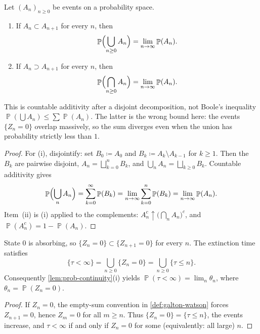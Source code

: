 \documentclass[11pt,a4paper]{article}
\DeclareMathOperator{\Pbb}{\mathbb{P}}
\begin{document}
\begin{lemma}
\label{lem:prob-continuity}
Let \((A_n)_{n\ge 0}\) be events on a probability space.
\begin{enumerate}[label=\textup{(\roman*)}]
    \item
    If \(A_n\subset A_{n+1}\) for every \(n\), then
    \[
    \Pbb\Bigl(\bigcup_{n\ge 0} A_n\Bigr)
    =
    \lim_{n\to\infty}\Pbb(A_n).
    \]
    \item
    If \(A_n\supset A_{n+1}\) for every \(n\), then
    \[
    \Pbb\Bigl(\bigcap_{n\ge 0} A_n\Bigr)
    =
    \lim_{n\to\infty}\Pbb(A_n).
    \]
\end{enumerate}
This is countable additivity after a disjoint decomposition, not Boole's inequality \(\Pbb(\bigcup A_n)\le\sum\Pbb(A_n)\). The latter is the wrong bound here: the events \(\{Z_n=0\}\) overlap massively, so the sum diverges even when the union has probability strictly less than \(1\).
\end{lemma}

\begin{proof}
For (i), disjointify: set \(B_0\coloneqq A_0\) and \(B_k\coloneqq A_k\setminus A_{k-1}\) for \(k\ge 1\). Then the \(B_k\) are pairwise disjoint, \(A_n=\bigsqcup_{k=0}^n B_k\), and \(\bigcup_n A_n=\bigsqcup_{k\ge 0} B_k\). Countable additivity gives
\[
\Pbb\Bigl(\bigcup_n A_n\Bigr)
=
\sum_{k=0}^\infty \Pbb(B_k)
=
\lim_{n\to\infty}\sum_{k=0}^n \Pbb(B_k)
=
\lim_{n\to\infty}\Pbb(A_n).
\]
Item~(ii) is (i) applied to the complements: \(A_n^c\uparrow\bigl(\bigcap_n A_n\bigr)^c\), and \(\Pbb(A_n^c)=1-\Pbb(A_n)\).
\end{proof}

\begin{lemma}
\label{lem:extinction-nested}
State \(0\) is absorbing, so \(\{Z_n=0\}\subset\{Z_{n+1}=0\}\) for every \(n\). The extinction time satisfies
\[
\{\tau<\infty\}
=
\bigcup_{n\ge 0}\{Z_n=0\}
=
\bigcup_{n\ge 0}\{\tau\le n\}.
\]
Consequently \cref{lem:prob-continuity}(i) yields \(\Pbb(\tau<\infty)=\lim_n\theta_n\), where \(\theta_n=\Pbb(Z_n=0)\).
\end{lemma}

\begin{proof}
If \(Z_n=0\), the empty-sum convention in \cref{def:galton-watson} forces \(Z_{n+1}=0\), hence \(Z_m=0\) for all \(m\ge n\). Thus \(\{Z_n=0\}=\{\tau\le n\}\), the events increase, and \(\tau<\infty\) if and only if \(Z_n=0\) for some (equivalently: all large) \(n\).
\end{proof}
\end{document}
